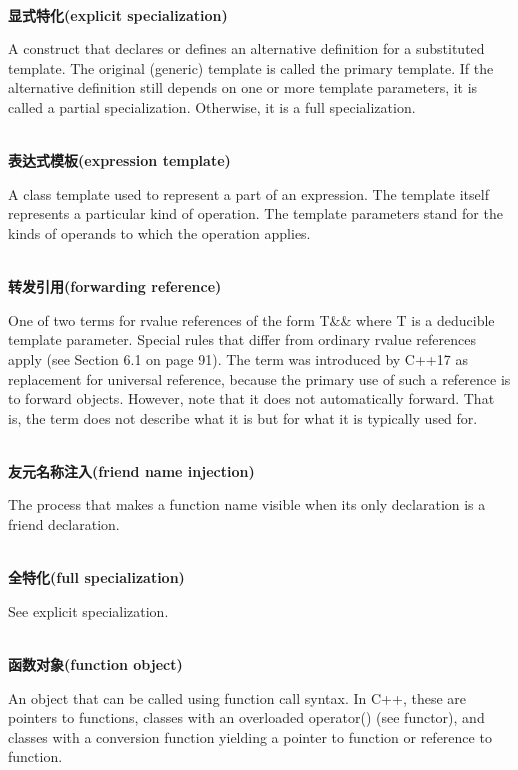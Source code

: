 \hspace*{\fill} \\ %
\noindent
\textbf{显式特化(explicit specialization)}

A construct that declares or defines an alternative definition for a substituted template. The original (generic) template is called the primary template. If the alternative definition still depends on one or more template parameters, it is called a partial specialization. Otherwise, it is a full specialization.

\hspace*{\fill} \\ %
\noindent
\textbf{表达式模板(expression template)}

A class template used to represent a part of an expression. The template itself represents a particular kind of operation. The template parameters stand for the kinds of operands to which the operation applies.

\hspace*{\fill} \\ %
\noindent
\textbf{转发引用(forwarding reference)}

One of two terms for rvalue references of the form T\&\& where T is a deducible template parameter. Special rules that differ from ordinary rvalue references apply (see Section 6.1 on page 91). The term was introduced by C++17 as replacement for universal reference, because the primary use of such a reference is to forward objects. However, note that it does not automatically forward. That is, the term does not describe what it is but for what it is typically used for.

\hspace*{\fill} \\ %
\noindent
\textbf{友元名称注入(friend name injection)}

The process that makes a function name visible when its only declaration is a friend declaration.

\hspace*{\fill} \\ %
\noindent
\textbf{全特化(full specialization)}

See explicit specialization.

\hspace*{\fill} \\ %
\noindent
\textbf{函数对象(function object)}

An object that can be called using function call syntax. In C++, these are pointers to functions, classes with an overloaded operator() (see functor), and classes with a conversion function yielding a pointer to function or reference to function.

